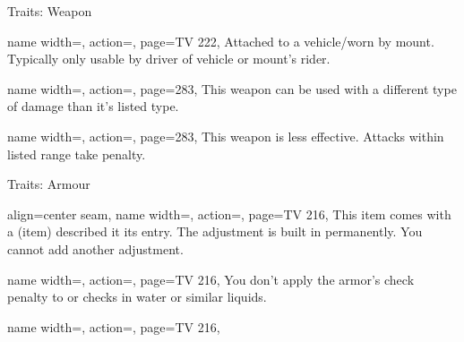 \begin{PageBackLandscape}
\begin{TablesHalf}{\backTableHeight}
\begin{Table}{Traits: Weapon}
            \breakLine
            \begin{entry}{}{%
                name width=\conditionLength,%
                action=\Vehicular,
                page=TV 222,
            }
                Attached to a vehicle/worn by mount. Typically only usable by driver of vehicle or mount's rider. \hfill
            \end{entry}
            \begin{entry}{}{%
                name width=\conditionLength,%
                action=\Versatile,
                page=283,
            }
                This weapon can be used with a different type of damage than it's listed type.
            \end{entry}
            \begin{entry}{}{%
                name width=\conditionLength,%
                action=\Volley,
                page=283,
            }
                This weapon is less effective. Attacks within listed range take  penalty.
            \end{entry}
        \end{Table}
    \end{TablesHalf}%
    \begin{TablesHalf}{\backTableHeight}%
        \renewcommand{\TableSpace}{\\\vspace{2mm}\\}%
        \begin{Table}{Traits: Armour}
            \begin{entry}{}{%
                align=center seam,
                name width=\conditionLength,%
                action=\Adjusted,
                page=TV 216,
            }
                This item comes with a  (item) described it its entry.
                The adjustment is built in permanently.
                You cannot add another adjustment.
            \end{entry}
            \begin{entry}{}{%
                name width=\conditionLength,%
                action=\Aquadynamic,
                page=TV 216,
            }
                You don't apply the armor's check penalty to \AcrobaticsT or \AthleticsT checks in water or similar liquids.
            \end{entry}
            \begin{entry}{}{%
                name width=\conditionLength,%
                action=\Barding,
                page=TV 216,
            }

\end{entry}
\end{Table}
\end{TablesHalf}
\end{PageBackLandscape}
